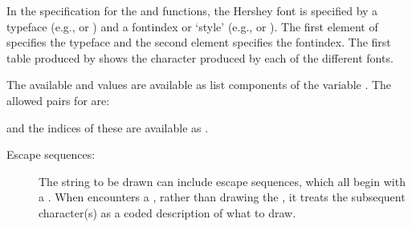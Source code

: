 \begin{Details}
In the  specification for the  and
 functions, the Hershey font is specified by a typeface
(e.g.,  or ) and a fontindex or
`style' (e.g.,  or ). The first
element of  specifies the typeface and the second element
specifies the fontindex.  The first table produced by
 shows the character  produced by each of
the different fonts.

The available  and  values are
available as list components of the variable .
The allowed pairs for  are:




and the indices of these are available as .

\begin{description}

\item[Escape sequences:] The string to be drawn can include escape
sequences, which all begin with a \samp{\bsl{}}.   When \R{} encounters a
\samp{\bsl{}}, rather than drawing the \samp{\bsl{}}, it treats the
subsequent character(s) as a coded description of what to draw.


\end{description}
\end{Details}
